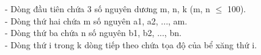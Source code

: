 - Dòng đầu tiên chứa 3 số nguyên dương m, n, k (m, n  $\le$  100).   
\\   - Dòng thứ hai chứa m số nguyên a1, a2, ..., am.   
\\   - Dòng thứ ba chứa n số nguyên b1, b2, ..., bn.   
\\   - Dòng thứ i trong k dòng tiếp theo chứa tọa độ của bể xăng thứ i.  

\
